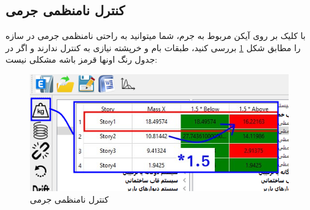 \subsection{کنترل نامنظمی جرمی}
با کلیک بر روی آیکن مربوط به جرم، شما میتوانید به راحتی نامنظمی جرمی در سازه را مطابق شکل 
\ref{pic:mass_irregularity}
بررسی کنید، طبقات بام و خرپشته نیازی به کنترل ندارند و اگر در جدول رنگ اونها قرمز باشه مشکلی نیست:

\begin{figure}[H]
    \centering
    \includegraphics[scale=.7]{figures/mass_irregularity}
    \caption{کنترل نامنظمی جرمی}
    \label{pic:mass_irregularity}
\end{figure}
